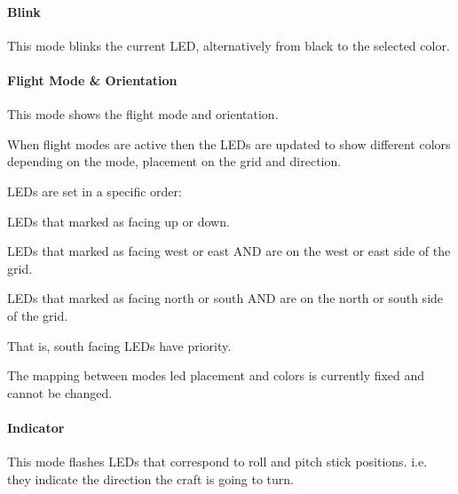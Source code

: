 \paragraph*{Blink}

This mode blinks the current L\+E\+D, alternatively from black to the selected color.

\paragraph*{Flight Mode \& Orientation}

This mode shows the flight mode and orientation.

When flight modes are active then the L\+E\+Ds are updated to show different colors depending on the mode, placement on the grid and direction.

L\+E\+Ds are set in a specific order\+:
\begin{DoxyItemize}
\item L\+E\+Ds that marked as facing up or down.
\item L\+E\+Ds that marked as facing west or east A\+N\+D are on the west or east side of the grid.
\item L\+E\+Ds that marked as facing north or south A\+N\+D are on the north or south side of the grid.
\end{DoxyItemize}

That is, south facing L\+E\+Ds have priority.

The mapping between modes led placement and colors is currently fixed and cannot be changed.

\paragraph*{Indicator}

This mode flashes L\+E\+Ds that correspond to roll and pitch stick positions. i.\+e. they indicate the direction the craft is going to turn.


